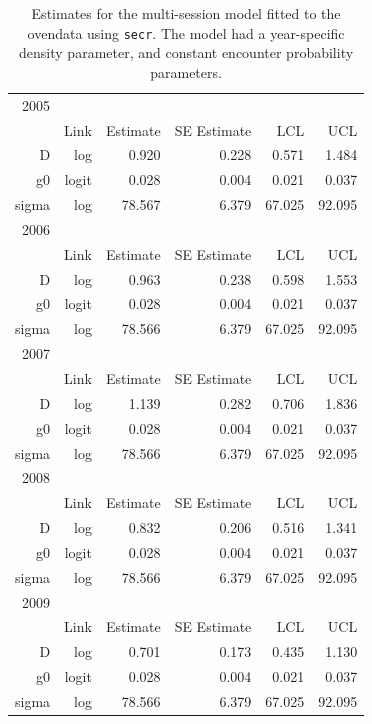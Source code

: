 \begin{table}
\caption{Estimates for the multi-session model fitted to the ovendata
  using \mbox{\tt secr}. The model had a year-specific density
  parameter, and constant encounter probability parameters.}
\begin{tabular}{rrrrrr} \hline
2005 & & & & & \\ 
     &  Link  &  Estimate  & SE Estimate    &    LCL     &    UCL \\ \hline
D    &   log &  0.920 &  0.228 &  0.571  &  1.484 \\
g0   & logit &  0.028 &  0.004 & 0.021  &  0.037 \\
sigma &  log &  78.567& 6.379 &  67.025 &  92.095 \\ \hline

2006 & & & & & \\ 
     &  Link  &  Estimate  & SE Estimate    &    LCL     &    UCL \\ \hline
D    &   log &  0.963 & 0.238 &  0.598  &  1.553 \\
g0   & logit &  0.028 &  0.004 &  0.021 & 0.037 \\
sigma &  log & 78.566 & 6.379 &  67.025 & 92.095 \\ \hline

2007 & & & & & \\ 
     &  Link  &  Estimate  & SE Estimate    &    LCL     &    UCL \\ \hline 
D    &   log & 1.139  & 0.282 &  0.706 &  1.836 \\
g0   &  logit & 0.028 & 0.004&  0.021  &  0.037 \\
sigma &  log & 78.566 & 6.379  & 67.025 &  92.095 \\ \hline

2008 & & & & & \\ 
     &  Link  &  Estimate  & SE Estimate    &    LCL     &    UCL \\ \hline
D   &    log &  0.832  & 0.206 &  0.516  &  1.341 \\
g0  &  logit & 0.028   &  0.004 &  0.021 &  0.037 \\
sigma  & log &  78.566 &  6.379 & 67.025 & 92.095 \\ \hline

2009 & & & & & \\ 
     &  Link  &  Estimate  & SE Estimate    &    LCL     &    UCL \\ \hline
D    &   log &  0.701 & 0.173 & 0.435  & 1.130 \\
g0  &  logit & 0.028  & 0.004 &  0.021 &  0.037 \\
sigma &  log & 78.566 & 6.379 & 67.025 & 92.095 \\ \hline
\end{tabular}
\label{multisessionsecr.output}
\end{table}


